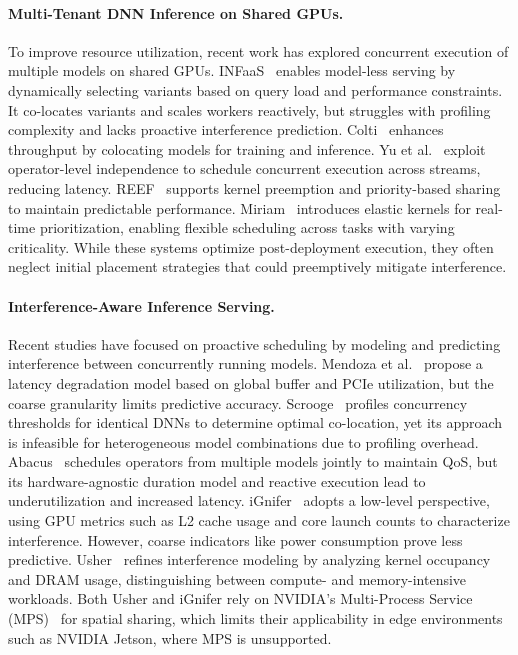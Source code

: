 \paragraph{Multi-Tenant DNN Inference on Shared GPUs.}
To improve resource utilization, recent work has explored concurrent execution of multiple models on shared GPUs. INFaaS~\cite{francisco2021infaas} enables model-less serving by dynamically selecting variants based on query load and performance constraints. It co-locates variants and scales workers reactively, but struggles with profiling complexity and lacks proactive interference prediction. Colti~\cite{mobin2023colti} enhances throughput by colocating models for training and inference. Yu et al.~\cite{yu2021automated} exploit operator-level independence to schedule concurrent execution across streams, reducing latency. REEF~\cite{han2022microsecond} supports kernel preemption and priority-based sharing to maintain predictable performance. Miriam~\cite{zhao2023miriam} introduces elastic kernels for real-time prioritization, enabling flexible scheduling across tasks with varying criticality. While these systems optimize post-deployment execution, they often neglect initial placement strategies that could preemptively mitigate interference.

\paragraph{Interference-Aware Inference Serving.}
Recent studies have focused on proactive scheduling by modeling and predicting interference between concurrently running models. Mendoza et al.~\cite{mendoza2021interference} propose a latency degradation model based on global buffer and PCIe utilization, but the coarse granularity limits predictive accuracy. Scrooge~\cite{hu2021scrooge} profiles concurrency thresholds for identical DNNs to determine optimal co-location, yet its approach is infeasible for heterogeneous model combinations due to profiling overhead. Abacus~\cite{cui2021Abacus} schedules operators from multiple models jointly to maintain QoS, but its hardware-agnostic duration model and reactive execution lead to underutilization and increased latency. iGnifer~\cite{xu2023iGniter} adopts a low-level perspective, using GPU metrics such as L2 cache usage and core launch counts to characterize interference. However, coarse indicators like power consumption prove less predictive. Usher~\cite{shubha2024usher} refines interference modeling by analyzing kernel occupancy and DRAM usage, distinguishing between compute- and memory-intensive workloads. Both Usher and iGnifer rely on NVIDIA's Multi-Process Service (MPS)~\cite{nvidiaMPS575} for spatial sharing, which limits their applicability in edge environments such as NVIDIA Jetson, where MPS is unsupported.